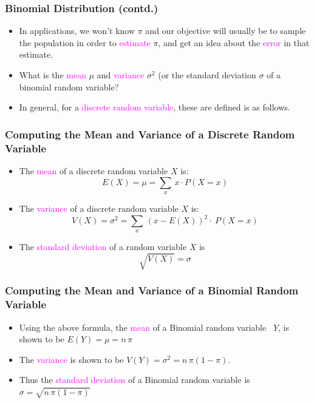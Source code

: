 \documentclass[xcolor=dvipsnames,12pt]{beamer}
\begin{document}
\begin{frame}
\frametitle{Binomial Distribution (contd.)}
\begin{itemize}
\item In applications, we won't know $\pi$ and our objective will
usually be to sample the population in order to \textcolor{magenta}{estimate}
$\pi$, and get an idea about the \textcolor{magenta}{error} in that estimate.
\item What is the \textcolor{magenta}{mean} $\mu$ and
\textcolor{magenta}{variance} $\sigma^2$ (or the standard deviation $\sigma$
of a binomial random variable?
\item In general, for a \textcolor{magenta}{discrete random variable}, these are defined is as follows.\\[.1in]
\end{itemize}
\end{frame}

\begin{frame}
\frametitle{Computing the Mean and Variance of a Discrete Random Variable}
\begin{itemize}
\addtolength{\itemsep}{-0.7\baselineskip}
\item The \textcolor{magenta}{mean} of a discrete random variable $X$ is:
$$
  E(X) = \mu = \sum_x\,x \cdot P(X=x)
$$
\item The \textcolor{magenta}{variance} of a discrete random variable $X$ is:
$$
  V(X) = \sigma^2= \sum_x\,(x - E(X))^2\cdot \ P(X=x) 
$$
\item The \textcolor{magenta}{standard deviation} of a random variable  $X$ is
$$\sqrt{V(X)}=\sigma$$
\end{itemize}
\end{frame}


\begin{frame}
\frametitle{Computing the Mean and Variance of a Binomial Random Variable}
\begin{itemize}
\item  Using the above formula, the \textcolor{magenta}{mean} of 
a Binomial random variable \ $Y$, is shown to be $E(Y)=\mu = n \, \pi$ 
\item The \textcolor{magenta}{variance} is shown to be $V(Y) =\sigma^2= n\,\pi(1 - \pi)$. 
\item Thus the 
\textcolor{magenta}{standard deviation} of a Binomial random variable is 
$\sigma= \sqrt{n\,\pi(1 - \pi)}$
\end{itemize}
\end{frame}
\end{document}

